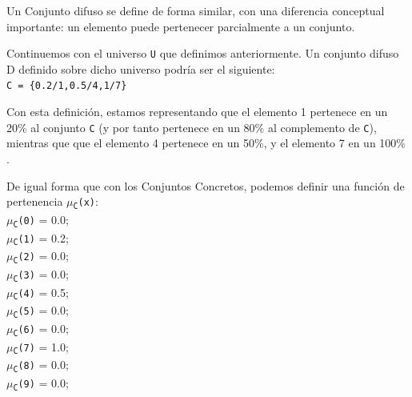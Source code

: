 Un Conjunto difuso se define de forma similar, con una diferencia conceptual importante: un elemento puede pertenecer parcialmente a un conjunto. 

Continuemos con el universo \texttt{U} que definimos anteriormente.
Un conjunto difuso D definido sobre dicho universo podría ser el siguiente:
\\ \newline
\null\hspace{0.59cm}\texttt{C = \{0.2/1,0.5/4,1/7\}}

Con esta definición, estamos representando que el elemento 1 pertenece en un 20\% al
conjunto \texttt{C} (y por tanto pertenece en un 80\% al complemento de \texttt{C}), mientras que
que el elemento 4 pertenece en un 50\%, y el elemento 7 en un 100\% .

De igual forma que con los Conjuntos Concretos, podemos definir una función de pertenencia \texttt{$\mu$\textsubscript{C}(x)}:
\\ \newline
\null\hspace{0.59cm}\texttt{$\mu$\textsubscript{C}(0)} = 0.0;\\
\null\hspace{0.59cm}\texttt{$\mu$\textsubscript{C}(1)} = 0.2;\\
\null\hspace{0.59cm}\texttt{$\mu$\textsubscript{C}(2)} = 0.0;\\
\null\hspace{0.59cm}\texttt{$\mu$\textsubscript{C}(3)} = 0.0;\\
\null\hspace{0.59cm}\texttt{$\mu$\textsubscript{C}(4)} = 0.5;\\
\null\hspace{0.59cm}\texttt{$\mu$\textsubscript{C}(5)} = 0.0;\\
\null\hspace{0.59cm}\texttt{$\mu$\textsubscript{C}(6)} = 0.0;\\
\null\hspace{0.59cm}\texttt{$\mu$\textsubscript{C}(7)} = 1.0;\\
\null\hspace{0.59cm}\texttt{$\mu$\textsubscript{C}(8)} = 0.0;\\
\null\hspace{0.59cm}\texttt{$\mu$\textsubscript{C}(9)} = 0.0;

